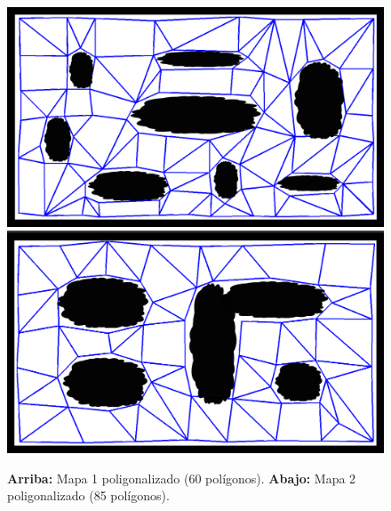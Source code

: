 \begin{figure}[htb]
	\begin{center}
		\includegraphics[scale=0.23]{figures/g1.png}
		\includegraphics[scale=0.23]{figures/g2.png}
	\end{center}
	\caption{\label{fig:gs}
	     \textbf{Arriba:} Mapa 1 poligonalizado (60 pol\'igonos).
	     \textbf{Abajo:} Mapa 2 poligonalizado (85 pol\'igonos).
     }
\end{figure}
